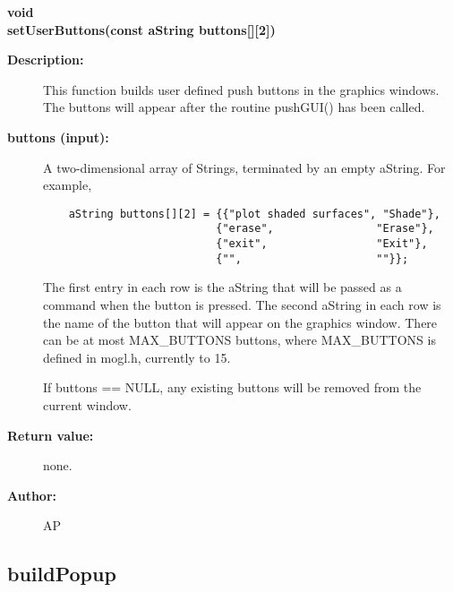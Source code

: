 \begin{flushleft} \textbf{%
void  \\ 
\settowidth{\GUIStateIncludeArgIndent}{setUserButtons(}%
setUserButtons(const aString buttons[][2])
}\end{flushleft}
\begin{description}
\item[{\bf Description:}] 
    This function builds user defined push buttons in the graphics windows. The buttons will
    appear after the routine pushGUI() has been called.
\item[{\bf buttons (input):}]  A two-dimensional array of Strings, terminated by an empty aString.
    For example,
    \begin{verbatim}
    aString buttons[][2] = {{"plot shaded surfaces", "Shade"}, 
                           {"erase",                "Erase"},
                           {"exit",                 "Exit"},
                           {"",                     ""}};
    \end{verbatim}
 The first entry in each row is the aString that will be passed as a command when the 
 button is pressed. The second aString in each row is the name of the button that will
 appear on the graphics window. There can be at most MAX\_BUTTONS buttons, where 
 MAX\_BUTTONS is defined in mogl.h, currently to 15.

 If buttons == NULL, any existing buttons will be removed 
 from the current window.
  

\item[{\bf Return value:}]  none.
\item[{\bf Author:}]  AP
\end{description}
\subsection{buildPopup}
 
